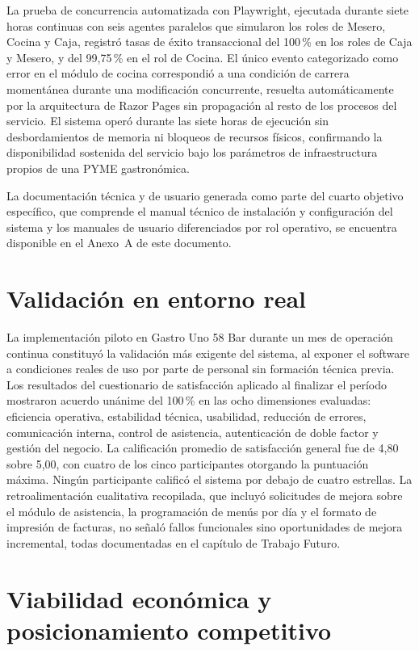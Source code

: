 La prueba de concurrencia automatizada con Playwright, ejecutada durante siete horas
continuas con seis agentes paralelos que simularon los roles de Mesero, Cocina y Caja,
registró tasas de éxito transaccional del 100\,\% en los roles de Caja y Mesero, y del
99,75\,\% en el rol de Cocina. El único evento categorizado como error en el módulo de
cocina correspondió a una condición de carrera momentánea durante una modificación
concurrente, resuelta automáticamente por la arquitectura de Razor Pages sin propagación
al resto de los procesos del servicio. El sistema operó durante las siete horas de
ejecución sin desbordamientos de memoria ni bloqueos de recursos físicos, confirmando
la disponibilidad sostenida del servicio bajo los parámetros de infraestructura propios
de una PYME gastronómica.

La documentación técnica y de usuario generada como parte del cuarto objetivo específico,
que comprende el manual técnico de instalación y configuración del sistema y los manuales
de usuario diferenciados por rol operativo, se encuentra disponible en el Anexo~A de este
documento.

\section*{Validación en entorno real}

La implementación piloto en Gastro Uno 58 Bar durante un mes de operación continua
constituyó la validación más exigente del sistema, al exponer el software a condiciones
reales de uso por parte de personal sin formación técnica previa. Los resultados del
cuestionario de satisfacción aplicado al finalizar el período mostraron acuerdo unánime
del 100\,\% en las ocho dimensiones evaluadas: eficiencia operativa, estabilidad técnica,
usabilidad, reducción de errores, comunicación interna, control de asistencia,
autenticación de doble factor y gestión del negocio. La calificación promedio de
satisfacción general fue de 4,80 sobre 5,00, con cuatro de los cinco participantes
otorgando la puntuación máxima. Ningún participante calificó el sistema por debajo de
cuatro estrellas. La retroalimentación cualitativa recopilada, que incluyó solicitudes
de mejora sobre el módulo de asistencia, la programación de menús por día y el formato
de impresión de facturas, no señaló fallos funcionales sino oportunidades de mejora
incremental, todas documentadas en el capítulo de Trabajo Futuro.

\section*{Viabilidad económica y posicionamiento competitivo}

